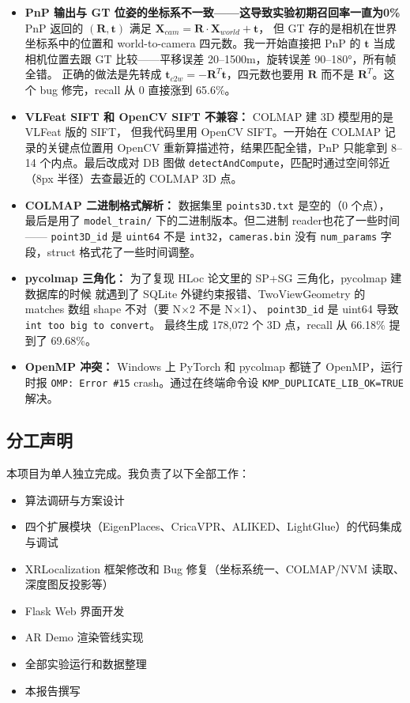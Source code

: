 \documentclass[12pt,a4paper]{ctexart}
\begin{document}
\begin{itemize}
  \item \textbf{PnP 输出与 GT 位姿的坐标系不一致——这导致实验初期召回率一直为0\%}
        PnP 返回的 $(\mathbf{R}, \mathbf{t})$ 满足 $\mathbf{X}_{cam} = \mathbf{R} \cdot \mathbf{X}_{world} + \mathbf{t}$，
        但 GT 存的是相机在世界坐标系中的位置和 world-to-camera 四元数。我一开始直接把 PnP 的
        $\mathbf{t}$ 当成相机位置去跟 GT 比较——平移误差 20--1500m，旋转误差 90--180°，所有帧全错。
        正确的做法是先转成 $\mathbf{t}_{c2w} = -\mathbf{R}^T \mathbf{t}$，四元数也要用 $\mathbf{R}$ 而不是
        $\mathbf{R}^T$。这个 bug 修完，recall 从 0 直接涨到 65.6\%。

  \item \textbf{VLFeat SIFT 和 OpenCV SIFT 不兼容：} COLMAP 建 3D 模型用的是 VLFeat 版的 SIFT，
        但我代码里用 OpenCV SIFT。一开始在 COLMAP 记录的关键点位置用 OpenCV
        重新算描述符，结果匹配全错，PnP 只能拿到 8--14 个内点。最后改成对 DB 图做
        \texttt{detectAndCompute}，匹配时通过空间邻近（8px 半径）去查最近的 COLMAP 3D 点。

  \item \textbf{COLMAP 二进制格式解析：} 数据集里 \texttt{points3D.txt} 是空的（0 个点），
        最后是用了 \texttt{model\_train/} 下的二进制版本。但二进制 reader也花了一些时间——
        \texttt{point3D\_id} 是 \texttt{uint64} 不是 \texttt{int32}，\texttt{cameras.bin} 没有
        \texttt{num\_params} 字段，struct 格式花了一些时间调整。

  \item \textbf{pycolmap 三角化：} 为了复现 HLoc 论文里的 SP+SG 三角化，pycolmap 建数据库的时候
        就遇到了 SQLite 外键约束报错、TwoViewGeometry 的 matches 数组 shape 不对（要 N×2 不是 N×1）、
        \texttt{point3D\_id} 是 uint64 导致 \texttt{int too big to convert}。
        最终生成 178,072 个 3D 点，recall 从 66.18\% 提到了 69.68\%。

  \item \textbf{OpenMP 冲突：} Windows 上 PyTorch 和 pycolmap 都链了 OpenMP，运行时报
        \texttt{OMP: Error \#15} crash。通过在终端命令设 \texttt{KMP\_DUPLICATE\_LIB\_OK=TRUE} 解决。
\end{itemize}

\subsection*{分工声明}

本项目为单人独立完成。我负责了以下全部工作：
\begin{itemize}
  \item 算法调研与方案设计
  \item 四个扩展模块（EigenPlaces、CricaVPR、ALIKED、LightGlue）的代码集成与调试
  \item XRLocalization 框架修改和 Bug 修复（坐标系统一、COLMAP/NVM 读取、深度图反投影等）
  \item Flask Web 界面开发
  \item AR Demo 渲染管线实现
  \item 全部实验运行和数据整理
  \item 本报告撰写
\end{itemize}
\end{document}
